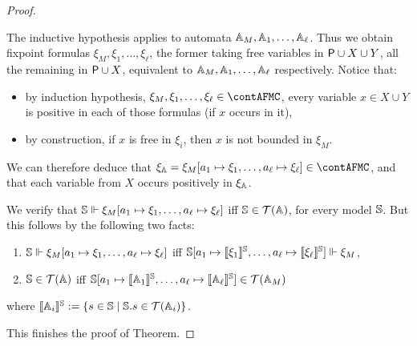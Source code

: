 \begin{proof}
\begin{pfclaim}
The inductive hypothesis applies to automata $\mathbb{A}_M, \mathbb{A}_{1}, \dots, \mathbb{A}_{\ell}$. Thus we obtain fixpoint formulas $\xi_M, \xi_1, \dots, \xi_\ell$, the former taking free variables in $\mathsf{P} \cup X \cup Y$, all the remaining in $\mathsf{P} \cup X$, equivalent to $\mathbb{A}_M, \mathbb{A}_1, \dots, \mathbb{A}_\ell$ respectively.
Notice that:
\begin{itemize}
\item by induction hypothesis, $\xi_M, \xi_1, \dots, \xi_\ell \in \contAFMC$, every variable $x \in X \cup Y$ is positive in each of those formulas (if $x$ occurs in it),
\item by construction, if $x$ is free in $\xi_i$, then $x$ is not bounded in $\xi_{M}$.
\end{itemize}
 We can therefore deduce that
 $\xi_\aut= \xi_{M}[a_1\mapsto\xi_{1}, \dots, a_\ell\mapsto\xi_{\ell}] \in \contAFMC$, and that each variable from $X$ occurs positively in $\xi_\mathbb{A}$.

 We verify that $\mathbb{S} \Vdash \xi_{M}[a_1\mapsto\xi_{1}, \dots, a_\ell\mapsto\xi_{\ell}]$ iff $\mathbb{S} \in \mathcal{T}(\mathbb{A})$, for every model $\mathbb{S}$.
But this follows by the following two facts:
\begin{enumerate}
\item $\mathbb{S}\Vdash \xi_{M}[a_1\mapsto\xi_{1}, \dots, a_\ell\mapsto\xi_{\ell}]$ iff $\mathbb{S}[a_1\mapsto \llbracket\xi_1\rrbracket^{\mathbb{S}}, \dots, a_\ell\mapsto \llbracket\xi_\ell\rrbracket^{\mathbb{S}}  ] \Vdash \xi_M$,
\item $\mathbb{S} \in \mathcal{T}(\mathbb{A})$  iff $\mathbb{S}[a_1\mapsto \llbracket\mathbb{A}_1\rrbracket^{\mathbb{S}}, \dots, a_\ell\mapsto \llbracket\mathbb{A}_\ell\rrbracket^{\mathbb{S}}  ] \in \mathcal{T}(\mathbb{A}_M)$
\end{enumerate}
where %
$\llbracket\mathbb{A}_i\rrbracket^{\mathbb{S}} := \{ s \in \mathbb{S} \mid \mathbb{S}.s \in \mathcal{T}(\mathbb{A}_i) \}$. 
\end{pfclaim}
This finishes the proof of Theorem. 
\end{proof}
